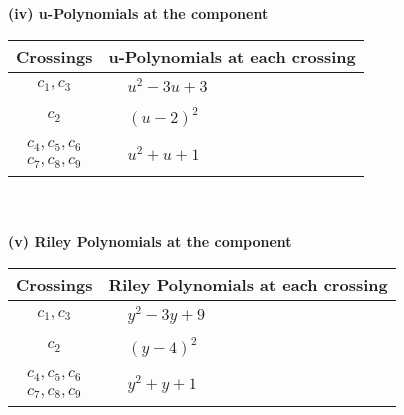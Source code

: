 \documentclass[1p]{elsarticle_modified}
\theoremstyle{definition}
\begin{document}
\newpage\renewcommand{\arraystretch}{1}
\flushleft \textbf{(iv) u-Polynomials at the component}\newline \\
\begin{tabular}{m{50pt}|m{274pt}}
Crossings & \hspace{64pt}u-Polynomials at each crossing \\
\hline $$\begin{aligned}c_{1},c_{3}\end{aligned}$$&$\begin{aligned}
&u^2-3 u+3
\end{aligned}$\\
\hline $$\begin{aligned}c_{2}\end{aligned}$$&$\begin{aligned}
&(u-2)^2
\end{aligned}$\\
\hline $$\begin{aligned}c_{4},c_{5},c_{6}\\c_{7},c_{8},c_{9}\end{aligned}$$&$\begin{aligned}
&u^2+u+1
\end{aligned}$\\
\hline
\end{tabular}\\~\\
\newpage\renewcommand{\arraystretch}{1}
\flushleft \textbf{(v) Riley Polynomials at the component}\newline \\
\begin{tabular}{m{50pt}|m{274pt}}
Crossings & \hspace{64pt}Riley Polynomials at each crossing \\
\hline $$\begin{aligned}c_{1},c_{3}\end{aligned}$$&$\begin{aligned}
&y^2-3 y+9
\end{aligned}$\\
\hline $$\begin{aligned}c_{2}\end{aligned}$$&$\begin{aligned}
&(y-4)^2
\end{aligned}$\\
\hline $$\begin{aligned}c_{4},c_{5},c_{6}\\c_{7},c_{8},c_{9}\end{aligned}$$&$\begin{aligned}
&y^2+y+1
\end{aligned}$\\
\hline
\end{tabular}\\~\\
\end{document}
